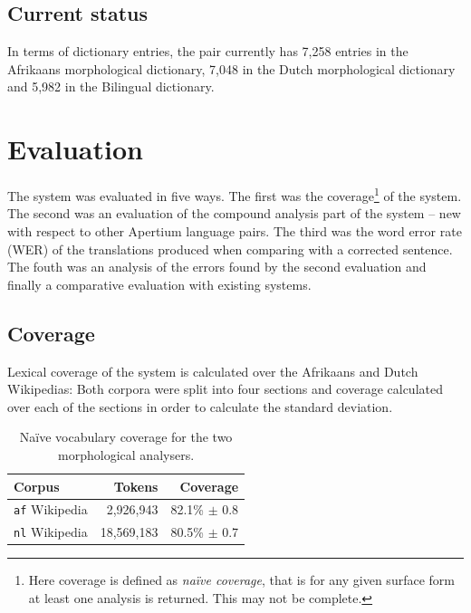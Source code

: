 \documentclass[11pt]{article}
\begin{document}
\subsection{Current status}

In terms of dictionary entries, the pair currently has 7,258 entries in the Afrikaans
morphological dictionary, 7,048 in the Dutch morphological dictionary and 5,982 in the 
Bilingual dictionary.

\section{Evaluation}

The system was evaluated in five ways. The first was the 
coverage\footnote{Here coverage is defined as \emph{na\"ive coverage}, 
that is for any given surface form at least one analysis is returned. This 
may not be complete.} of the system. The second was an evaluation of the 
compound analysis part of the system -- new with respect to other 
Apertium language pairs. The third was the word error 
rate (WER) of the translations produced when comparing with a 
corrected sentence. The fouth was an analysis of the errors found by the second
evaluation and finally a comparative evaluation with existing systems.

\subsection{Coverage}

Lexical coverage of the system is calculated over the Afrikaans and Dutch Wikipedias:
Both corpora were split into four sections and coverage calculated over each of the 
sections in order to calculate the standard deviation.

\begin{table}
  \begin{center}
  \begin{tabular}{|l|r|r|}
   \hline
   {\bf Corpus}           & {\bf Tokens}    & {\bf Coverage}\\
   \hline
   {\tt af} Wikipedia     & 2,926,943       & 82.1\% $\pm$ 0.8 \\
   \hline
   {\tt nl} Wikipedia     & 18,569,183      & 80.5\% $\pm$ 0.7 \\
   \hline
  \end{tabular}
    \caption{Na\"ive vocabulary coverage for the two morphological analysers.}
    \label{table:coverage}
  \end{center}
\end{table}
\end{document}
